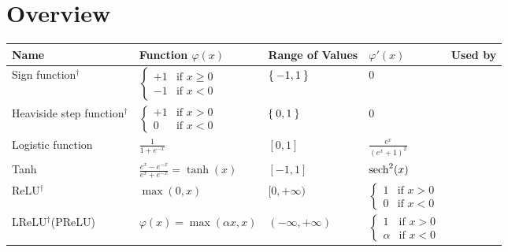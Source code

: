 
\appendix
\onecolumn
\section*{Overview}
\begin{table}[H]
    \centering
    \hspace*{-1cm}\begin{tabular}{lllll}
    \toprule
    Name                     & Function $\varphi(x)$ & Range of Values & $\varphi'(x)$ & Used by \\\midrule %
    Sign function$^\dagger$  & $\begin{cases}+1 &\text{if } x \geq 0\\-1 &\text{if } x < 0\end{cases}$ & $\Set{-1,1}$                              & $0$                    & \cite{971754} \\
    \parbox[t]{2.6cm}{Heaviside\\step function$^\dagger$} & $\begin{cases}+1 &\text{if } x > 0\\0 &\text{if } x < 0\end{cases}$ & $\Set{0, 1}$  & $0$                       & \cite{mcculloch1943logical}\\
    Logistic function        & $\frac{1}{1+e^{-x}}$                           & $[0, 1]$                                                        & $\frac{e^x}{(e^x +1)^2}$  & \cite{duch1999survey} \\
    Tanh                     & $\frac{e^x - e^{-x}}{e^x + e^{-x}} = \tanh(x)$ & $[-1, 1]$                                                       & $\operatorname*{sech}^2(x)$              & \cite{LeNet-5,Thoma:2014}\\
    \gls{ReLU}$^\dagger$           & $\max(0, x)$                                   & $[0, +\infty)$                                                  & $\begin{cases}1 &\text{if } x > 0\\0 &\text{if } x < 0\end{cases}$      & \cite{AlexNet-2012}\\
    \parbox[t]{2.6cm}{\gls{LReLU}$^\dagger$\footnotemark\\(\gls{PReLU})} & $\varphi(x) = \max(\alpha x, x)$                        & $(-\infty, +\infty)$                                             & $\begin{cases}1 &\text{if } x > 0\\\alpha &\text{if } x < 0\end{cases}$ & \cite{maas2013rectifier,he2015delving} \\

\end{tabular}
\end{table}
